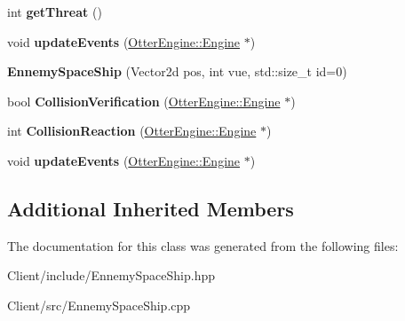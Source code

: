 \begin{DoxyCompactItemize}
\item 
int {\bfseries get\+Threat} ()\hypertarget{class_ennemy_space_ship_a29c50331be588590efcf0030c1f8d7bb}{}\label{class_ennemy_space_ship_a29c50331be588590efcf0030c1f8d7bb}

\item 
void {\bfseries update\+Events} (\hyperlink{class_otter_engine_1_1_engine}{Otter\+Engine\+::\+Engine} $\ast$)\hypertarget{class_ennemy_space_ship_a4c6fb1607445f68fedc14f915c29189a}{}\label{class_ennemy_space_ship_a4c6fb1607445f68fedc14f915c29189a}

\item 
{\bfseries Ennemy\+Space\+Ship} (Vector2d pos, int vue, std\+::size\+\_\+t id=0)\hypertarget{class_ennemy_space_ship_a2bfc1997443e6dc251692baf80391d5b}{}\label{class_ennemy_space_ship_a2bfc1997443e6dc251692baf80391d5b}

\item 
bool {\bfseries Collision\+Verification} (\hyperlink{class_otter_engine_1_1_engine}{Otter\+Engine\+::\+Engine} $\ast$)\hypertarget{class_ennemy_space_ship_a9e516e7678070bb882ccc1452b59e59b}{}\label{class_ennemy_space_ship_a9e516e7678070bb882ccc1452b59e59b}

\item 
int {\bfseries Collision\+Reaction} (\hyperlink{class_otter_engine_1_1_engine}{Otter\+Engine\+::\+Engine} $\ast$)\hypertarget{class_ennemy_space_ship_a784aec309b121c0cc5010df59c6e2c16}{}\label{class_ennemy_space_ship_a784aec309b121c0cc5010df59c6e2c16}

\item 
void {\bfseries update\+Events} (\hyperlink{class_otter_engine_1_1_engine}{Otter\+Engine\+::\+Engine} $\ast$)\hypertarget{class_ennemy_space_ship_a4c6fb1607445f68fedc14f915c29189a}{}\label{class_ennemy_space_ship_a4c6fb1607445f68fedc14f915c29189a}

\end{DoxyCompactItemize}
\subsection*{Additional Inherited Members}


The documentation for this class was generated from the following files\+:\begin{DoxyCompactItemize}
\item 
Client/include/Ennemy\+Space\+Ship.\+hpp\item 
Client/src/Ennemy\+Space\+Ship.\+cpp\end{DoxyCompactItemize}
